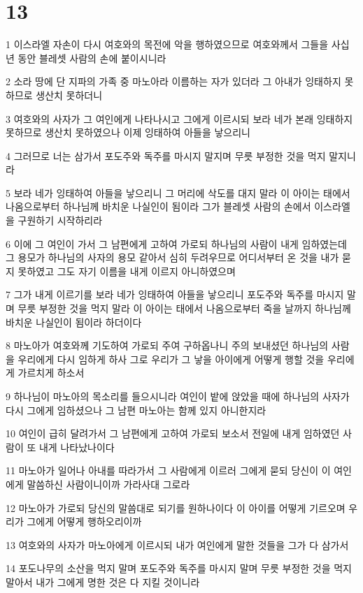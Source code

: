 \chapter{13}

\par 1 이스라엘 자손이 다시 여호와의 목전에 악을 행하였으므로 여호와께서 그들을 사십 년 동안 블레셋 사람의 손에 붙이시니라
\par 2 소라 땅에 단 지파의 가족 중 마노아라 이름하는 자가 있더라 그 아내가 잉태하지 못하므로 생산치 못하더니
\par 3 여호와의 사자가 그 여인에게 나타나시고 그에게 이르시되 보라 네가 본래 잉태하지 못하므로 생산치 못하였으나 이제 잉태하여 아들을 낳으리니
\par 4 그러므로 너는 삼가서 포도주와 독주를 마시지 말지며 무릇 부정한 것을 먹지 말지니라
\par 5 보라 네가 잉태하여 아들을 낳으리니 그 머리에 삭도를 대지 말라 이 아이는 태에서 나옴으로부터 하나님께 바치운 나실인이 됨이라 그가 블레셋 사람의 손에서 이스라엘을 구원하기 시작하리라
\par 6 이에 그 여인이 가서 그 남편에게 고하여 가로되 하나님의 사람이 내게 임하였는데 그 용모가 하나님의 사자의 용모 같아서 심히 두려우므로 어디서부터 온 것을 내가 묻지 못하였고 그도 자기 이름을 내게 이르지 아니하였으며
\par 7 그가 내게 이르기를 보라 네가 잉태하여 아들을 낳으리니 포도주와 독주를 마시지 말며 무릇 부정한 것을 먹지 말라 이 아이는 태에서 나옴으로부터 죽을 날까지 하나님께 바치운 나실인이 됨이라 하더이다
\par 8 마노아가 여호와께 기도하여 가로되 주여 구하옵나니 주의 보내셨던 하나님의 사람을 우리에게 다시 임하게 하사 그로 우리가 그 낳을 아이에게 어떻게 행할 것을 우리에게 가르치게 하소서
\par 9 하나님이 마노아의 목소리를 들으시니라 여인이 밭에 앉았을 때에 하나님의 사자가 다시 그에게 임하셨으나 그 남편 마노아는 함께 있지 아니한지라
\par 10 여인이 급히 달려가서 그 남편에게 고하여 가로되 보소서 전일에 내게 임하였던 사람이 또 내게 나타났나이다
\par 11 마노아가 일어나 아내를 따라가서 그 사람에게 이르러 그에게 묻되 당신이 이 여인에게 말씀하신 사람이니이까 가라사대 그로라
\par 12 마노아가 가로되 당신의 말씀대로 되기를 원하나이다 이 아이를 어떻게 기르오며 우리가 그에게 어떻게 행하오리이까
\par 13 여호와의 사자가 마노아에게 이르시되 내가 여인에게 말한 것들을 그가 다 삼가서
\par 14 포도나무의 소산을 먹지 말며 포도주와 독주를 마시지 말며 무릇 부정한 것을 먹지 말아서 내가 그에게 명한 것은 다 지킬 것이니라
